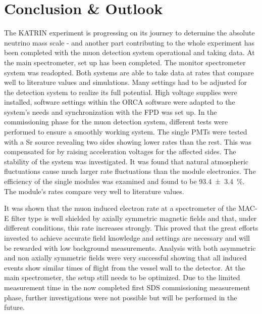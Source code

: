 
\chapter{Conclusion \& Outlook}
\label{ch:Conclusion}
The KATRIN experiment is progressing on its journey to determine the absolute neutrino mass scale - and another part contributing to the whole experiment has been completed with the muon detection system operational and taking data. 
At the main spectrometer, set up has been completed. The monitor spectrometer system was readopted. Both systems are able to take data at rates that compare well to literature values and simulations.
Many settings had to be adjusted for the detection system to realize its full potential. High voltage supplies were installed, software settings within the ORCA software were adapted to the system's needs and synchronization with the FPD was set up.
In the commissioning phase for the muon detection system, different tests were performed to ensure a smoothly working system. The single PMTs were tested with a Sr source revealing two sides showing lower rates than the rest. This was compensated for by raising acceleration voltages for the affected sides. The stability of the system was investigated. It was found that natural atmospheric fluctuations cause much larger rate fluctuations than the module electronics. The efficiency of the single modules was examined and found to be \SI{93.4 \pm 3.4}{\percent}. The module's rates compare very well to literature values. 

It was shown that the muon induced electron rate at a spectrometer of the MAC-E filter type is well shielded by axially symmetric magnetic fields and that, under different conditions, this rate increases strongly. This proved that the great efforts invested to achieve accurate field knowledge and settings are necessary and will be rewarded with low background measurements.
Analysis with both asymmetric and non axially symmetric fields were very successful showing that all induced events show similar times of flight from the vessel wall to the detector. At the main spectrometer, the setup still needs to be optimized. Due to the limited measurement time in the now completed first SDS commissioning measurement phase, further investigations were not possible but will be performed in the future.



